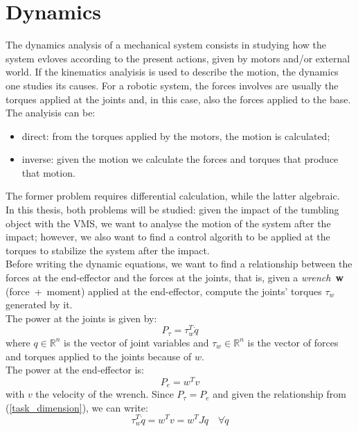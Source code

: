 \documentclass[a4paper,12pt,oneside]{report}
\begin{document}
\chapter{Dynamics}\label{dynamics}
The dynamics analysis of a mechanical system consists in studying how the system evloves according to the present actions, given by motors and/or external world. If the kinematics analyisis is used to describe the motion, the dynamics one studies its causes. For a robotic system, the forces involves are usually the torques applied at the joints and, in this case, also the forces applied to the base.\\
The analyisis can be:
\begin{itemize}
  \item direct: from the torques applied by the motors, the motion is calculated;
  \item inverse: given the motion we calculate the forces and torques that produce that motion.
\end{itemize}
The former problem requires differential calculation, while the latter algebraic.\\
In this thesis, both problems will be studied: given the impact of the tumbling object with the VMS, we want to analyse the motion of the system after the impact; however, we also want to find a control algorith to be applied at the torques to stabilize the system after the impact.\\
Before writing the dynamic equations, we want to find a relationship between the forces at the end-effector and the forces at the joints, that is, given a \textit{wrench}~\textbf{w} (force~+~moment) applied at the end-effector, compute the joints' torques $\tau_w$ generated by it.\\
The power at the joints is given by:
\begin{equation}
  P_{\tau}=\tau_w^T\dot{q}
\end{equation}
where $q \in \mathbb{R}^n$ is the vector of joint variables and  $\tau_w \in \mathbb{R}^n$ is the vector of forces and torques applied to the joints because of $w$.\\
The power at the end-effector is:
\begin{equation}
  P_e=w^Tv
\end{equation}
with $v$ the velocity of the wrench. Since $P_\tau=P_e$ and given the relationship from (\ref{task_dimension}), we can write:
\begin{equation}
  \tau_w^T\dot{q}=w^Tv=w^TJ\dot{q} \quad \forall\dot{q}
\end{equation}
\end{document}
